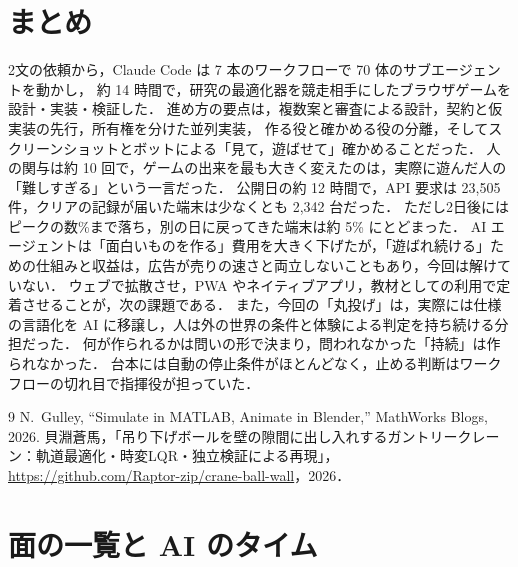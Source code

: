 \documentclass[a4paper,10pt]{ltjsarticle}
\begin{document}
\section{まとめ}
2文の依頼から，Claude Code は 7 本のワークフローで 70 体のサブエージェントを動かし，
約 14 時間で，研究の最適化器を競走相手にしたブラウザゲームを設計・実装・検証した．
進め方の要点は，複数案と審査による設計，契約と仮実装の先行，所有権を分けた並列実装，
作る役と確かめる役の分離，そしてスクリーンショットとボットによる「見て，遊ばせて」確かめることだった．
人の関与は約 10 回で，ゲームの出来を最も大きく変えたのは，実際に遊んだ人の「難しすぎる」という一言だった．
公開日の約 12 時間で，API 要求は 23,505 件，クリアの記録が届いた端末は少なくとも 2,342 台だった．
ただし2日後にはピークの数\%まで落ち，別の日に戻ってきた端末は約 5\% にとどまった．
AI エージェントは「面白いものを作る」費用を大きく下げたが，「遊ばれ続ける」ための仕組みと収益は，広告が売りの速さと両立しないこともあり，今回は解けていない．
ウェブで拡散させ，PWA やネイティブアプリ，教材としての利用で定着させることが，次の課題である．
また，今回の「丸投げ」は，実際には仕様の言語化を AI に移譲し，人は外の世界の条件と体験による判定を持ち続ける分担だった．
何が作られるかは問いの形で決まり，問われなかった「持続」は作られなかった．
台本には自動の停止条件がほとんどなく，止める判断はワークフローの切れ目で指揮役が担っていた．

\begin{thebibliography}{9}
 N.~Gulley, ``Simulate in MATLAB, Animate in Blender,'' MathWorks Blogs, 2026.
 貝淵蒼馬，「吊り下げボールを壁の隙間に出し入れするガントリークレーン：軌道最適化・時変LQR・独立検証による再現」，
\url{https://github.com/Raptor-zip/crane-ball-wall}，2026．
\end{thebibliography}

\appendix
\section{面の一覧と AI のタイム}
\end{document}

